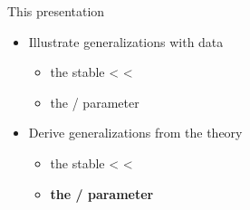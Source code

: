 \documentclass[xcolor=dvipsnames,10pt]{beamer}
\begin{document}
\begin{frame}[t]{This presentation}

\pause

\begin{itemize}
  \item Illustrate generalizations with data\pause
  \begin{itemize}
  \item the stable  <  < \pause
  \item the / parameter\pause
  \end{itemize}
  \item Derive generalizations from the theory\pause
  \begin{itemize}
    \item the stable  <  < \pause
    \item \textbf<8>{the / parameter}
  \end{itemize}
\end{itemize}


\end{frame}
\end{document}
